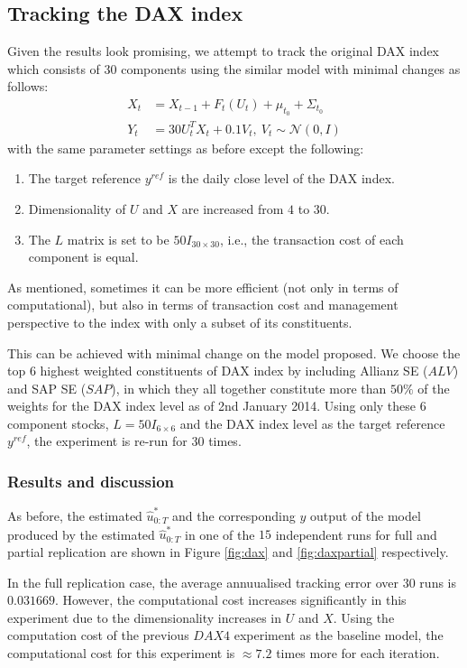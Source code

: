 \subsection{Tracking the DAX index}
Given the results look promising, we attempt to track the original DAX index which consists of $30$ components using the similar model with minimal changes as follows:
\begin{align}
  X_t &= X_{t-1} + F_t(U_t) + \mu_{t_0} + \Sigma_{t_0} \\
  Y_t &= 30U^T_tX_t + 0.1V_t,~V_t \sim \mathcal{N}(0, I)
\end{align}
with the same parameter settings as before except the following:
\begin{enumerate}
\item The target reference $y^{ref}$ is the daily close level of the DAX index.
\item Dimensionality of $U$ and $X$ are increased from $4$ to $30$.
\item The $L$ matrix is set to be $50I_{30 \times 30}$, i.e., the transaction cost of each component is equal.
\end{enumerate}

As mentioned, sometimes it can be more efficient (not only in terms of computational), but also in terms of transaction cost and management perspective to the index with only a subset of its constituents.

This can be achieved with minimal change on the model proposed. We choose the top $6$ highest weighted constituents of DAX index by including Allianz SE ($ALV$) and SAP SE ($SAP$), in which they all together constitute more than $50\%$ of the weights for the DAX index level as of 2nd January 2014. Using only these $6$ component stocks, $L=50I_{6 \times 6}$ and the DAX index level as the target reference $y^{ref}$, the experiment is re-run for $30$ times.

\subsubsection{Results and discussion}
As before, the estimated $\hat{u}^*_{0:T}$ and the corresponding $y$ output of the model produced by the estimated $\hat{u}^*_{0:T}$ in one of the $15$ independent runs for full and partial replication are shown in Figure \ref{fig:dax} and \ref{fig:daxpartial} respectively.

In the full replication case, the average annuualised tracking error over $30$ runs is $0.031669$. However, the computational cost increases significantly in this experiment due to the dimensionality increases in $U$ and $X$. Using the computation cost of the previous $DAX4$ experiment as the baseline model, the computational cost for this experiment is $\approx 7.2$ times more for each iteration.

